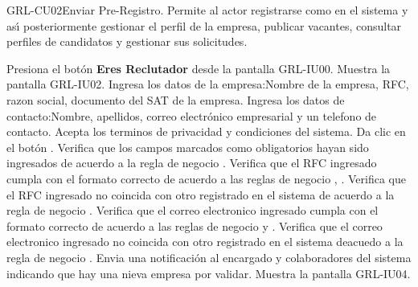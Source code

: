\begin{UseCase}[]{GRL-CU02}{Enviar Pre-Registro.}{
	Permite al actor registrarse como en el sistema y ası́ posteriormente gestionar el perfil de la empresa, 
	publicar  vacantes, consultar perfiles de candidatos y gestionar sus solicitudes.
}

\end{UseCase}

\begin{UCtrayectoria}
	\UCpaso [\UCactor] Presiona el botón \textbf{Eres Reclutador} desde la pantalla GRL-IU00.
    \UCpaso [\UCsist] Muestra la pantalla GRL-IU02.
	\UCpaso [\UCactor] Ingresa los datos de la empresa:Nombre de la empresa, RFC, razon social, documento del SAT de la empresa.\label{cu02-grl1}
	\UCpaso [\UCactor] Ingresa los datos de contacto:Nombre, apellidos, correo electrónico empresarial y un telefono de contacto.
	\UCpaso [\UCactor] Acepta los terminos de privacidad y condiciones del sistema.
	\UCpaso [\UCactor] Da clic en el botón . 
    \UCpaso [\UCsist] Verifica que los campos marcados como obligatorios hayan sido ingresados de acuerdo a la
	regla de negocio .
	\UCpaso [\UCsist] Verifica que el RFC ingresado cumpla con el formato correcto de acuerdo a las reglas de negocio  , .
	\UCpaso [\UCsist] Verifica que el RFC ingresado no coincida con otro registrado en el sistema de acuerdo a la regla de negocio  .
	\UCpaso [\UCsist] Verifica que el correo electronico ingresado cumpla con el formato correcto de acuerdo a las reglas de negocio   y  . \label{cu02-grl2}
	\UCpaso [\UCsist] Verifica que el correo electronico ingresado no coincida con otro registrado en el sistema deacuedo a la regla de negocio  .
	\UCpaso [\UCsist] Envia una notificación al encargado y colaboradores del sistema indicando que hay una nieva empresa por validar.
    \UCpaso [\UCsist] Muestra la pantalla GRL-IU04.
\end{UCtrayectoria}

